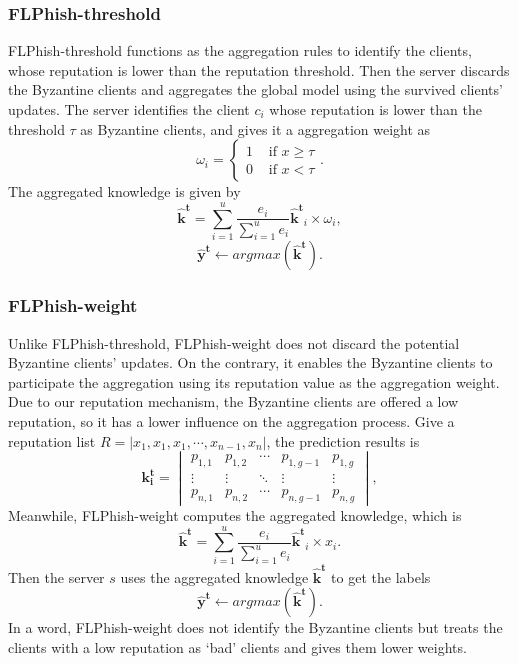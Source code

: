\documentclass[journal]{IEEEtran}
\begin{document}
\subsubsection{{FLPhish-threshold}}
FLPhish-threshold functions as the aggregation rules to identify the clients, whose reputation is lower than the reputation threshold. Then the server discards the Byzantine clients and aggregates the global model using the survived clients' updates. The server identifies the client ${c_{i}}$ whose reputation is lower than the threshold $\tau$ as Byzantine clients, and gives it a aggregation weight as
\begin{equation}
  \omega_{i}=\begin{cases}
    1 & \text{ if } x\geq \tau \\ 
    0 & \text{ if } x< \tau 
    \end{cases}.
\end{equation} 
The aggregated knowledge is given by
\begin{equation}
  \mathbf{\hat{k}^t}=\sum_{i=1}^{u}\frac{e_i}{\sum_{i=1}^{u}e_i}\mathbf{\hat{k}^t}_i\times \omega_{i},
\end{equation}
\begin{equation}
  \mathbf{\hat{y}^t}\gets argmax(\mathbf{\hat{k}^t}).
\end{equation} 
\subsubsection{{FLPhish-weight}}
Unlike FLPhish-threshold, FLPhish-weight does not discard the potential Byzantine clients' updates. On the contrary, it enables the Byzantine clients to participate the aggregation using its reputation value as the aggregation weight. Due to our reputation mechanism, the Byzantine clients are offered a low reputation, so it has a lower influence on the aggregation process.
Give a reputation list $R=\left | x_{1},x_{1},x_{1},\cdots ,x_{n-1},x_{n} \right |$, the prediction results is 
  \begin{equation}
    \mathbf{k_i^t}=\begin{vmatrix}
      p_{1,1} & p_{1,2} & \cdots  & p_{1,g-1} & p_{1,g}\\ 
      \vdots  & \vdots & \ddots  & \vdots & \vdots\\ 
      p_{n,1} & p_{n,2} & \cdots  & p_{n,g-1} & p_{n,g}
      \end{vmatrix},
  \end{equation}
  Meanwhile, FLPhish-weight computes the aggregated knowledge, which is
    \begin{equation}
    \mathbf{\hat{k}^t}=\sum_{i=1}^{u}\frac{e_i}{\sum_{i=1}^{u}e_i}\mathbf{\hat{k}^t}_i\times x_{i}.
  \end{equation}
  Then the server $s$ uses the aggregated knowledge $\mathbf{\hat{k}^t}$ to get the labels
  \begin{equation}
    \mathbf{\hat{y}^t}\gets argmax(\mathbf{\hat{k}^t}).
  \end{equation} 
In a word, FLPhish-weight does not identify the Byzantine clients but treats the clients with a low reputation as `bad' clients and gives them lower weights.
\end{document}
